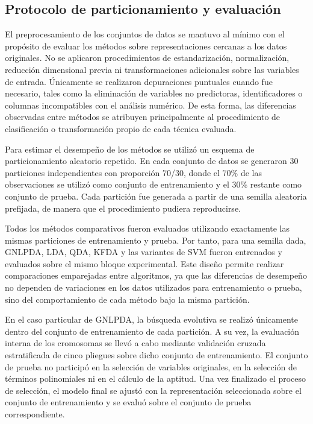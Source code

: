 \subsection{Protocolo de particionamiento y evaluación}

El preprocesamiento de los conjuntos de datos se mantuvo al mínimo con el propósito de evaluar los métodos sobre representaciones cercanas a los datos originales. No se aplicaron procedimientos de estandarización, normalización, reducción dimensional previa ni transformaciones adicionales sobre las variables de entrada. Únicamente se realizaron depuraciones puntuales cuando fue necesario, tales como la eliminación de variables no predictoras, identificadores o columnas incompatibles con el análisis numérico. De esta forma, las diferencias observadas entre métodos se atribuyen principalmente al procedimiento de clasificación o transformación propio de cada técnica evaluada.

Para estimar el desempeño de los métodos se utilizó un esquema de particionamiento aleatorio repetido. En cada conjunto de datos se generaron 30 particiones independientes con proporción 70/30, donde el 70\% de las observaciones se utilizó como conjunto de entrenamiento y el 30\% restante como conjunto de prueba. Cada partición fue generada a partir de una semilla aleatoria prefijada, de manera que el procedimiento pudiera
reproducirse.

Todos los métodos comparativos fueron evaluados utilizando exactamente las mismas
particiones de entrenamiento y prueba. Por tanto, para una semilla dada, GNLPDA, LDA, QDA, KFDA y las variantes de SVM fueron entrenados y evaluados sobre el mismo bloque experimental. Este diseño permite realizar comparaciones emparejadas entre algoritmos, ya que las diferencias de desempeño no dependen de variaciones en los datos utilizados para entrenamiento o prueba, sino del comportamiento de cada método bajo la misma partición.

En el caso particular de GNLPDA, la búsqueda evolutiva se realizó únicamente dentro del conjunto de entrenamiento de cada partición. A su vez, la evaluación interna de los cromosomas se llevó a cabo mediante validación cruzada estratificada de cinco pliegues sobre dicho conjunto de entrenamiento. El conjunto de prueba no participó en la selección de variables originales, en la selección de términos polinomiales ni en el cálculo de la aptitud. Una vez finalizado el proceso de selección, el modelo final se ajustó con la representación seleccionada sobre el conjunto de entrenamiento y se evaluó sobre el conjunto de prueba correspondiente.

